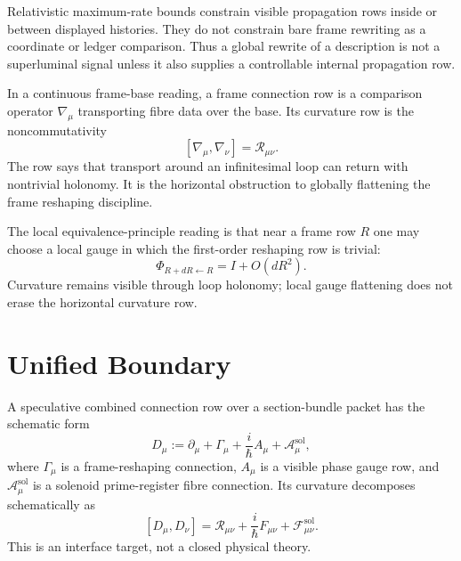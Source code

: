 \begin{principle}
\label{prin:quantum-gr-light-cone-internal-propagation}
Relativistic maximum-rate bounds constrain visible propagation rows
inside or between displayed histories. They do not constrain bare frame
rewriting as a coordinate or ledger comparison. Thus a global rewrite of
a description is not a superluminal signal unless it also supplies a
controllable internal propagation row.
\end{principle}

\begin{definition}
\label{def:quantum-gr-frame-connection-curvature-row}
In a continuous frame-base reading, a frame connection row is a
comparison operator $\nabla_\mu$ transporting fibre data over the base.
Its curvature row is the noncommutativity
$$
[\nabla_\mu,\nabla_\nu]=\mathcal R_{\mu\nu}.
$$
The row says that transport around an infinitesimal loop can return with
nontrivial holonomy. It is the horizontal obstruction to globally
flattening the frame reshaping discipline.
\end{definition}

\begin{principle}
\label{prin:quantum-gr-equivalence-local-gauge-flattening}
The local equivalence-principle reading is that near a frame row $R$ one
may choose a local gauge in which the first-order reshaping row is
trivial:
$$
\Phi_{R+dR\leftarrow R}=I+O(dR^2).
$$
Curvature remains visible through loop holonomy; local gauge flattening
does not erase the horizontal curvature row.
\end{principle}

\section{Unified Boundary}
\label{sec:quantum-gr-unified-boundary}

\begin{definition}
\label{def:quantum-gr-combined-connection-row}
A speculative combined connection row over a section-bundle packet has
the schematic form
$$
D_\mu
:=
\partial_\mu+\Gamma_\mu+\frac{i}{\hbar}A_\mu+\mathcal A_\mu^{\mathrm{sol}},
$$
where $\Gamma_\mu$ is a frame-reshaping connection, $A_\mu$ is a visible
phase gauge row, and $\mathcal A_\mu^{\mathrm{sol}}$ is a solenoid
prime-register fibre connection. Its curvature decomposes schematically
as
$$
[D_\mu,D_\nu]
=
\mathcal R_{\mu\nu}
+
\frac{i}{\hbar}F_{\mu\nu}
+
\mathcal F_{\mu\nu}^{\mathrm{sol}}.
$$
This is an interface target, not a closed physical theory.
\end{definition}


